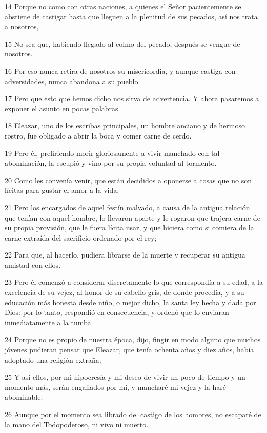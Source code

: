 \par 14 Porque no como con otras naciones, a quienes el Señor pacientemente se abstiene de castigar hasta que lleguen a la plenitud de sus pecados, así nos trata a nosotros,
\par 15 No sea que, habiendo llegado al colmo del pecado, después se vengue de nosotros.
\par 16 Por eso nunca retira de nosotros su misericordia, y aunque castiga con adversidades, nunca abandona a su pueblo.
\par 17 Pero que esto que hemos dicho nos sirva de advertencia. Y ahora pasaremos a exponer el asunto en pocas palabras.
\par 18 Eleazar, uno de los escribas principales, un hombre anciano y de hermoso rostro, fue obligado a abrir la boca y comer carne de cerdo.
\par 19 Pero él, prefiriendo morir gloriosamente a vivir manchado con tal abominación, la escupió y vino por su propia voluntad al tormento.
\par 20 Como les convenía venir, que están decididos a oponerse a cosas que no son lícitas para gustar el amor a la vida.
\par 21 Pero los encargados de aquel festín malvado, a causa de la antigua relación que tenían con aquel hombre, lo llevaron aparte y le rogaron que trajera carne de su propia provisión, que le fuera lícita usar, y que hiciera como si comiera de la carne extraída del sacrificio ordenado por el rey;
\par 22 Para que, al hacerlo, pudiera librarse de la muerte y recuperar su antigua amistad con ellos.
\par 23 Pero él comenzó a considerar discretamente lo que correspondía a su edad, a la excelencia de su vejez, al honor de su cabello gris, de donde procedía, y a su educación más honesta desde niño, o mejor dicho, la santa ley hecha y dada por Dios: por lo tanto, respondió en consecuencia, y ordenó que lo enviaran inmediatamente a la tumba.
\par 24 Porque no es propio de nuestra época, dijo, fingir en modo alguno que muchos jóvenes pudieran pensar que Eleazar, que tenía ochenta años y diez años, había adoptado una religión extraña;
\par 25 Y así ellos, por mi hipocresía y mi deseo de vivir un poco de tiempo y un momento más, serán engañados por mí, y mancharé mi vejez y la haré abominable.
\par 26 Aunque por el momento sea librado del castigo de los hombres, no escaparé de la mano del Todopoderoso, ni vivo ni muerto.
